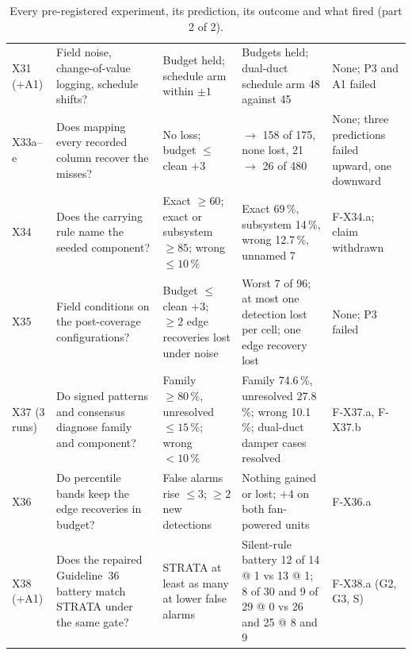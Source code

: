 \documentclass[11pt,letterpaper]{article}
\begin{document}
\begin{table}[p]
\begin{tabular}{@{}>{\raggedright\arraybackslash}p{1.1cm}>{\raggedright\arraybackslash}p{4.6cm}>{\raggedright\arraybackslash}p{3.3cm}>{\raggedright\arraybackslash}p{4.3cm}>{\raggedright\arraybackslash}p{2.2cm}@{}}
X31 (+A1) & Field noise, change-of-value logging, schedule shifts? & Budget held; schedule arm within $\pm 1$ & Budgets held; dual-duct schedule arm 48 against 45 & None; P3 and A1 failed \\
X33a--e & Does mapping every recorded column recover the misses? & No loss; budget $\le$ clean $+ 3$ & 142 $\to$ 158 of 175, none lost, 21 $\to$ 26 of 480 & None; three predictions failed upward, one downward \\
X34 & Does the carrying rule name the seeded component? & Exact $\ge 60$; exact or subsystem $\ge 85$; wrong $\le 10\,\%$ & Exact 69\,\%, subsystem 14\,\%, wrong 12.7\,\%, unnamed 7 & F-X34.a; claim withdrawn \\
X35 & Field conditions on the post-coverage configurations? & Budget $\le$ clean $+ 3$; $\ge 2$ edge recoveries lost under noise & Worst 7 of 96; at most one detection lost per cell; one edge recovery lost & None; P3 failed \\
X37 (3 runs) & Do signed patterns and consensus diagnose family and component? & Family $\ge 80\,\%$, unresolved $\le 15\,\%$; wrong $< 10\,\%$ & Family 74.6\,\%, unresolved 27.8\,\%; wrong 10.1\,\%; dual-duct damper cases resolved & F-X37.a, F-X37.b \\
X36 & Do percentile bands keep the edge recoveries in budget? & False alarms rise $\le 3$; $\ge 2$ new detections & Nothing gained or lost; $+4$ on both fan-powered units & F-X36.a \\
X38 (+A1) & Does the repaired Guideline~36 battery match STRATA under the same gate? & STRATA at least as many at lower false alarms & Silent-rule battery 12 of 14 @ 1 vs 13 @ 1; 8 of 30 and 9 of 29 @ 0 vs 26 and 25 @ 8 and 9 & F-X38.a (G2, G3, S) \\
\hline
\end{tabular}
\caption{Every pre-registered experiment, its prediction, its outcome and what fired (part 2 of 2).}
\label{tab:ledger-b}
\end{table}
\end{document}
